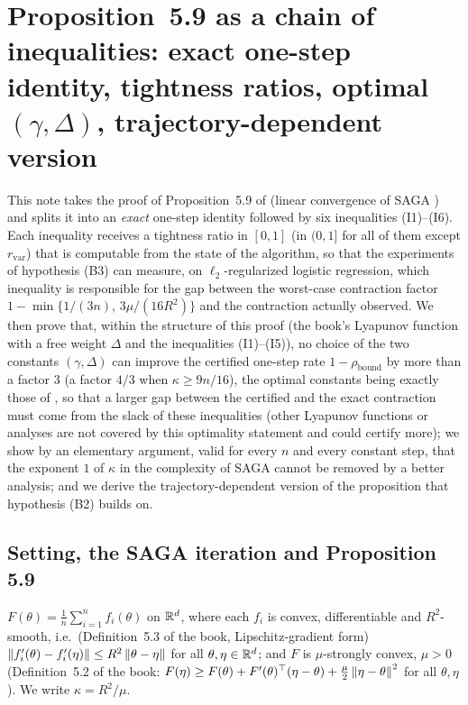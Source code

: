 \section{Proposition~5.9 as a chain of inequalities: exact one-step identity, tightness ratios, optimal \texorpdfstring{$(\gamma,\Delta)$}{(gamma,Delta)}, trajectory-dependent version}
\label{sec:B3_prop59_tightness}

This note takes the proof of Proposition~5.9 of \cite{bach2024learning} (linear convergence of SAGA \cite{defazio2014saga}) and splits it into an \emph{exact} one-step identity followed by six inequalities (I1)--(I6). Each inequality receives a tightness ratio in $[0,1]$ (in $(0,1]$ for all of them except $r_{\mathrm{var}}$) that is computable from the state of the algorithm, so that the experiments of hypothesis (B3) can measure, on $\ell_2$-regularized logistic regression, which inequality is responsible for the gap between the worst-case contraction factor $1-\min\{1/(3n),\,3\mu/(16R^2)\}$ and the contraction actually observed. We then prove that, within the structure of this proof (the book's Lyapunov function with a free weight $\Delta$ and the inequalities (I1)--(I5)), no choice of the two constants $(\gamma,\Delta)$ can improve the certified one-step rate $1-\rho_{\mathrm{bound}}$ by more than a factor $3$ (a factor $4/3$ when $\kappa\ge9n/16$), the optimal constants being exactly those of \cite{hofmann2015variance}, so that a larger gap between the certified and the exact contraction must come from the slack of these inequalities (other Lyapunov functions or analyses are not covered by this optimality statement and could certify more); we show by an elementary argument, valid for every $n$ and every constant step, that the exponent $1$ of $\kappa$ in the complexity of SAGA cannot be removed by a better analysis; and we derive the trajectory-dependent version of the proposition that hypothesis (B2) builds on.

\subsection{Setting, the SAGA iteration and Proposition 5.9}

\begin{assumption}\label{ass:B3-setting}
$F(\theta)=\frac1n\sum_{i=1}^n f_i(\theta)$ on $\mathbb{R}^d$, where each $f_i$ is convex, differentiable and $R^2$-smooth, i.e.\ (Definition~5.3 of the book, Lipschitz-gradient form)
$\left\|f'_i(\theta)-f'_i(\eta)\right\|\le R^2\left\|\theta-\eta\right\|$ for all $\theta,\eta\in\mathbb{R}^d$;
and $F$ is $\mu$-strongly convex, $\mu>0$ (Definition~5.2 of the book: $F(\eta)\ge F(\theta)+F'(\theta)^\top(\eta-\theta)+\frac{\mu}{2}\left\|\eta-\theta\right\|^2$ for all $\theta,\eta$). We write $\kappa=R^2/\mu$.
\end{assumption}

